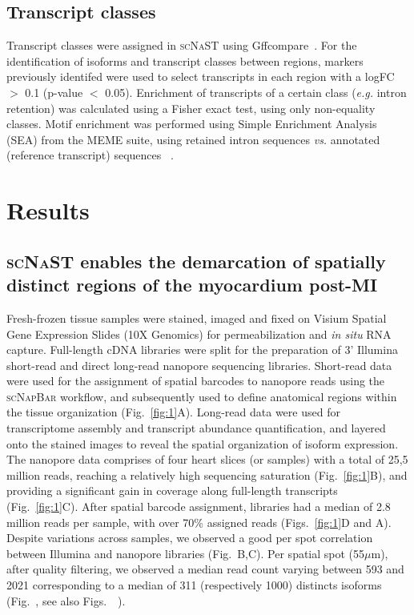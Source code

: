 \documentclass[utf8]{FrontiersinHarvard} %
\newcommand{\insi}{\textit{in situ}\xspace}
\newcommand{\eg}{\textit{e.g.}\xspace}
\newcommand{\vs}{\textit{vs.}\xspace}
\newcommand{\scn}{\textsc{scNapBar}\xspace}
\newcommand{\scnast}{\textsc{scNaST}\xspace}
\begin{document}
\subsection*{Transcript classes}
Transcript classes were assigned in \scnast using Gffcompare~\citep{Pertea2020:gff}.
For the identification of isoforms and transcript classes between regions, markers previously identifed were used to select transcripts in each region with a logFC $>$ 0.1 (p-value $<$ 0.05).
Enrichment of transcripts of a certain class (\eg intron retention) was calculated using a Fisher exact test, using only non-equality classes.
Motif enrichment was performed using Simple Enrichment Analysis (SEA) from the MEME suite, using retained intron sequences \vs annotated (reference transcript) sequences ~\citep{Bailey2015:MEME}.


\section*{Results}

\subsection*{\scnast enables the demarcation of spatially distinct regions of the myocardium post-MI}
Fresh-frozen tissue samples were stained, imaged and fixed on Visium Spatial Gene Expression Slides (10X Genomics) for permeabilization and \insi RNA capture.
Full-length cDNA libraries were split for the preparation of 3' Illumina short-read and direct long-read nanopore sequencing libraries.
Short-read data were used for the assignment of spatial barcodes to nanopore reads using the \scn workflow, and subsequently used to define anatomical regions within the tissue organization (Fig.~\ref{fig:1}A).
Long-read data were used for transcriptome assembly and transcript abundance quantification, and layered onto the stained images to reveal the spatial organization of isoform expression.
The nanopore data comprises of four heart slices (or samples) with a total of 25,5 million reads, reaching a relatively high sequencing saturation (Fig.~\ref{fig:1}B), and providing a significant gain in coverage along full-length transcripts (Fig.~\ref{fig:1}C).
After spatial barcode assignment, libraries had a median of 2.8 million reads per sample, with over 70\% assigned reads (Figs.~\ref{fig:1}D and A).
Despite variations across samples, we observed a good per spot correlation between Illumina and nanopore libraries (Fig.~B,C).
Per spatial spot (55$\mu$m), after quality filtering, we observed a median read count varying between 593 and 2021 corresponding to a median of 311 (respectively 1000) distincts isoforms (Fig.~, see also Figs.~~).
\end{document}

